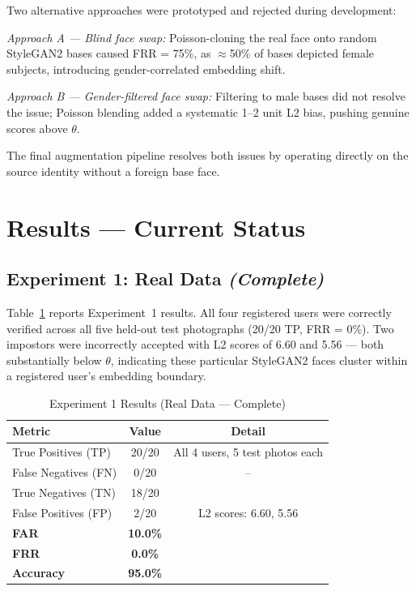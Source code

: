 \documentclass[conference]{IEEEtran}
\begin{document}
Two alternative approaches were prototyped and rejected during development:

\textit{Approach A — Blind face swap:} Poisson-cloning the real face onto random StyleGAN2 bases caused FRR = 75\%, as $\approx$50\% of bases depicted female subjects, introducing gender-correlated embedding shift.

\textit{Approach B — Gender-filtered face swap:} Filtering to male bases did not resolve the issue; Poisson blending added a systematic 1--2 unit L2 bias, pushing genuine scores above $\theta$.

The final augmentation pipeline resolves both issues by operating directly on the source identity without a foreign base face.

\section{Results — Current Status}

\subsection{Experiment 1: Real Data \textit{(Complete)}}

Table~\ref{tab:exp1} reports Experiment~1 results. All four registered users were correctly verified across all five held-out test photographs (20/20 TP, FRR = 0\%). Two impostors were incorrectly accepted with L2 scores of 6.60 and 5.56 — both substantially below $\theta$, indicating these particular StyleGAN2 faces cluster within a registered user's embedding boundary.

\begin{table}[H]
\centering
\caption{Experiment 1 Results (Real Data --- Complete)}
\label{tab:exp1}
\renewcommand{\arraystretch}{1.2}
\begin{tabular}{lcc}
\toprule
Metric & Value & Detail \\
\midrule
True Positives (TP) & 20/20 & All 4 users, 5 test photos each \\
False Negatives (FN) & 0/20 & -- \\
True Negatives (TN) & 18/20 & \\
False Positives (FP) & 2/20 & L2 scores: 6.60, 5.56 \\
\midrule
\textbf{FAR} & \textbf{10.0\%} & \\
\textbf{FRR} & \textbf{0.0\%} & \\
\textbf{Accuracy} & \textbf{95.0\%} & \\
\bottomrule
\end{tabular}
\end{table}
\end{document}
